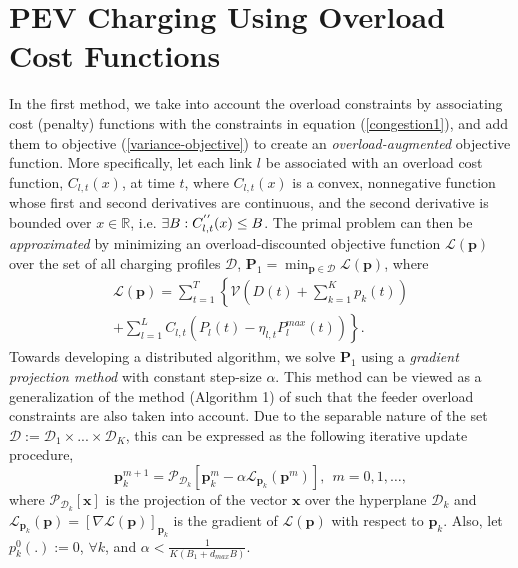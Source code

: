 \documentclass[12pt,draftcls,onecolumn]{IEEEtran}
\begin{document}
\section{PEV Charging Using Overload Cost Functions} \label{sec:overload-cost}
\indent In the first method, we take into account the overload constraints by associating cost (penalty) functions with the constraints in equation (\ref{congestion1}), and add them to objective (\ref{variance-objective}) to create an \emph{overload-augmented} objective function. More specifically, let each link $l$ be associated with an overload cost function, $C_{l,t}(x)$, at time $t$, where $C_{l,t}(x)$ is a convex, nonnegative function whose first and second derivatives are continuous, and the second derivative is bounded over $x \in \mathbb{R}$, i.e.  $\exists B: C_{l,t}^{\rq{}\rq{}}(x) \leq B$. The primal problem can then be \emph{approximated} by minimizing an overload-discounted objective function $\mathcal{L}(\mathbf{p})$ over the set of all charging profiles $\mathcal{D}$, $\mathbf{P}_1= \min_{\mathbf{p}\in \mathcal{D}}\mathcal{L}(\mathbf{p})$, where
\begin{gather}
\mathcal{L}(\mathbf{p}) = \sum_{t=1}^{T}\left\{\mathcal{V}\left(D(t)+\sum_{k=1}^{K}p_k(t)\right) \right. \nonumber\\
\left. + \sum_{l=1}^{L} C_{l,t}\left(P_l(t)-\eta_{l,t} P_l^{max}(t)\right) \right\}. \label{cost-method-def2}
\end{gather}
Towards developing a distributed algorithm, we solve $\mathbf{P}_1$ using a \textit{gradient projection method} with constant step-size $\alpha$. This method can be viewed as a generalization of the method (Algorithm 1) of \cite{GTL13} such that the feeder overload constraints are also taken into account. Due to the separable nature of the set $\mathcal{D} := \mathcal{D}_1 \times ... \times \mathcal{D}_K$, this can be expressed as the following iterative update procedure,
\begin{equation}
\mathbf{p}_k^{m+1} = \mathcal{P}_{\mathcal{D}_k}[\mathbf{p}_k^{m}-\alpha \mathcal{L}_{\mathbf{p}_k}(\mathbf{p}^m)], \ \ m=0,1, \ldots,
\label{renew1}
\end{equation}
where $\mathcal{P}_{\mathcal{D}_k}[\mathbf{x}]$ is the projection of the vector $\mathbf{x}$ over the hyperplane $\mathcal{D}_k$ and $\mathcal{L}_{\mathbf{p}_k}(\mathbf{p})=[\nabla \mathcal{L}(\mathbf{p})]_{\mathbf{p}_k}$ is the gradient of $\mathcal{L}(\mathbf{p})$ with respect to $\mathbf{p}_k$.
Also, let $p_k^{0}(.):=0$, $\forall k$, and $\alpha < \frac{1}{K(B_1+d_{max}B)}$.
\end{document}
